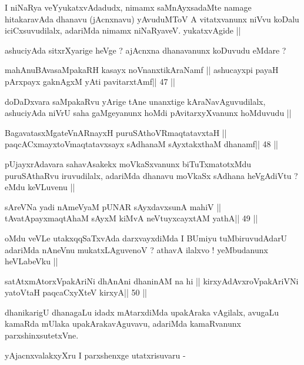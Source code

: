 \begin{artha}
I niNaRya veYyukatxvAdadudx, nimamx saMnAyxsadaMte namage hitakaravAda
dhanavu (jAcnxnavu) yAvuduMToV A vitatxvanunx niVvu koDalu
iciCxsuvudilalx, adariMda nimamx niNaRyaveV. yukatxvAgide ||

ashuciyAda sitxrXyarige heVge ? ajAcnxna dhanavanunx koDuvudu eMdare ?
\end{artha}

\begin{shl}
mahAnuBAvasaMpakaRH kasayx noVnanxtikAraNamf ||
ashucayxpi payaH pArxpayx gaknAgxM yAti pavitarxtAmf\hfill || 47 ||
\end{shl}

\begin{artha}
doDaDxvara saMpakaRvu yArige tAne unanxtige kAraNavAguvudilalx,
ashuciyAda niVrU saha gaMgeyanunx hoMdi pAvitarxyXvanunx hoMduvudu ||
\end{artha}

\begin{shl}
BagavatasxMgateVnARnayxH puruSAthoVR\s maqtatavxtaH ||
paqcACxmayxtoV\s maqtatavxsayx sAdhanaM sAyxtakxthaM dhanamf\hfill || 48 ||
\end{shl}

\begin{artha}
pUjayxrAdavara sahavAsakekx moVkaSxvanunx biTuTxmatotxMdu puruSAthaRvu
iruvudilalx, adariMda dhanavu moVkaSx sAdhana heVgAdiVtu ? eMdu
keVLuvenu ||
\end{artha}

\begin{shl}
sAreVNa yadi nAmeVyaM pUNAR sAyxdavxsunA mahiV ||
tAvatA\s payxmaqtA\s haM sAyxM kiMvA neVtuyxcayxtAM yathA\hfill || 49 ||
\end{shl}

\begin{artha}
oMdu veVLe utakxqqSaTxvAda darxvayxdiMda I BUmiyu tuMbiruvudAdarU
adariMda nAneVnu mukatxLAguvenoV ? athavA ilalxvo ! yeMbudanunx
heVLabeVku ||
\end{artha}

\begin{shl}
satAtxmAtorxVpakAriNi dhAnAni dhaninAM na hi ||
kirxyAdAvxroVpakAriVNi yatoV\s taH paqcaCxyXteV kirxyA\hfill || 50 ||
\end{shl}

\begin{artha}
dhanikarigU dhanagaLu idadx mAtarxdiMda upakAraka vAgilalx, avugaLu
kamaRda mUlaka upakArakavAguvavu, adariMda kamaRvanunx
parxshinxsutetxVne.

yAjacnxvalakxyXru I parxshenxge utatxrisuvaru -
\end{artha}


